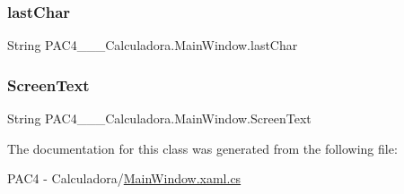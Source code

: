 \subsubsection{\texorpdfstring{last\+Char}{lastChar}}
{\footnotesize\ttfamily String P\+A\+C4\+\_\+\+\_\+\+\_\+\+Calculadora.\+Main\+Window.\+last\+Char\hspace{0.3cm}{\ttfamily [private]}}

\mbox{\label{class_p_a_c4_______calculadora_1_1_main_window_aee69de38aec96054ba9ea9b83b202d2d}} 
\subsubsection{\texorpdfstring{Screen\+Text}{ScreenText}}
{\footnotesize\ttfamily String P\+A\+C4\+\_\+\+\_\+\+\_\+\+Calculadora.\+Main\+Window.\+Screen\+Text\hspace{0.3cm}{\ttfamily [private]}}



The documentation for this class was generated from the following file\+:\begin{DoxyCompactItemize}
\item 
P\+A\+C4 -\/ Calculadora/\mbox{\hyperlink{_main_window_8xaml_8cs}{Main\+Window.\+xaml.\+cs}}\end{DoxyCompactItemize}
